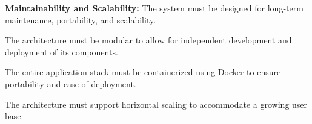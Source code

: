 \begin{nonfunctionalmod}[MAINT]
    \item \textbf{Maintainability and Scalability:} The system must be designed for long-term maintenance, portability, and scalability.
    \begin{nonfunctionalmod}
        \item The architecture must be modular to allow for independent development and deployment of its components.
        \item The entire application stack must be containerized using Docker to ensure portability and ease of deployment.
        \item The architecture must support horizontal scaling to accommodate a growing user base.
    \end{nonfunctionalmod}
\end{nonfunctionalmod}